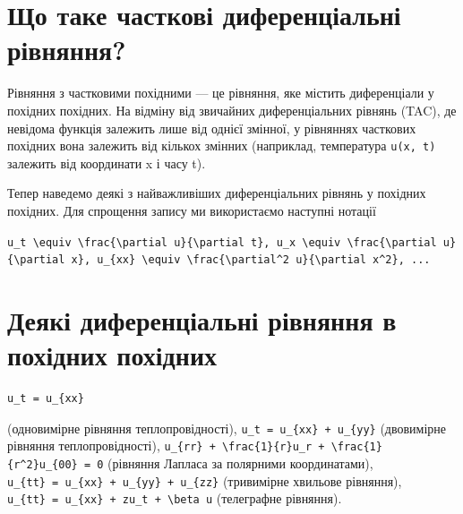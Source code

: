 \documentclass[
  ukrainian,
]{article}
\begin{document}
\section{Що таке часткові диференціальні
рівняння?}\label{ux449ux43e-ux442ux430ux43aux435-ux447ux430ux441ux442ux43aux43eux432ux456-ux434ux438ux444ux435ux440ux435ux43dux446ux456ux430ux43bux44cux43dux456-ux440ux456ux432ux43dux44fux43dux43dux44f}

Рівняння з частковими похідними --- це рівняння, яке містить
диференціали у похідних похідних. На відміну від звичайних
диференціальних рівнянь (TAC), де невідома функція залежить лише від
однієї змінної, у рівняннях часткових похідних вона залежить від кількох
змінних (наприклад, температура \texttt{u(x,\ t)} залежить від
координати x і часу t).

Тепер наведемо деякі з найважливіших диференціальних рівнянь у похідних
похідних. Для спрощення запису ми використаємо наступні нотації

\texttt{\textquotesingle{}u\_t\ \textbackslash{}equiv\ \textbackslash{}frac\{\textbackslash{}partial\ u\}\{\textbackslash{}partial\ t\}\textquotesingle{},\ \textquotesingle{}u\_x\ \textbackslash{}equiv\ \textbackslash{}frac\{\textbackslash{}partial\ u\}\{\textbackslash{}partial\ x\}\textquotesingle{},\ \textquotesingle{}u\_\{xx\}\ \textbackslash{}equiv\ \textbackslash{}frac\{\textbackslash{}partial\^{}2\ u\}\{\textbackslash{}partial\ x\^{}2\}\textquotesingle{},\ ...}

\section{Деякі диференціальні рівняння в похідних
похідних}\label{ux434ux435ux44fux43aux456-ux434ux438ux444ux435ux440ux435ux43dux446ux456ux430ux43bux44cux43dux456-ux440ux456ux432ux43dux44fux43dux43dux44f-ux432-ux43fux43eux445ux456ux434ux43dux438ux445-ux43fux43eux445ux456ux434ux43dux438ux445}

\begin{verbatim}
u_t = u_{xx}
\end{verbatim}

(одновимірне рівняння теплопровідності),
\texttt{u\_t\ =\ u\_\{xx\}\ +\ u\_\{yy\}} (двовимірне рівняння
теплопровідності),
\texttt{u\_\{rr\}\ +\ \textbackslash{}frac\{1\}\{r\}u\_r\ +\ \textbackslash{}frac\{1\}\{r\^{}2\}u\_\{00\}\ =\ 0}
(рівняння Лапласа за полярними координатами),
\texttt{u\_\{tt\}\ =\ u\_\{xx\}\ +\ u\_\{yy\}\ +\ u\_\{zz\}} (тривимірне
хвильове рівняння),
\texttt{u\_\{tt\}\ =\ u\_\{xx\}\ +\ zu\_t\ +\ \textbackslash{}beta\ u}
(телеграфне рівняння).
\end{document}
